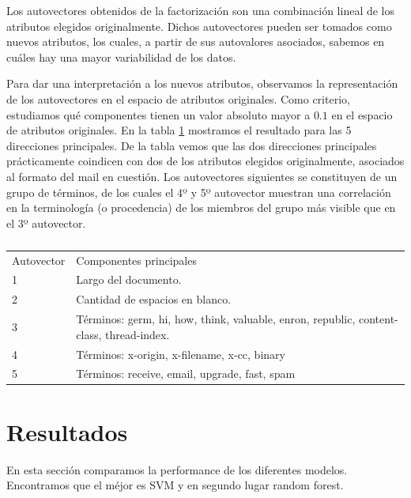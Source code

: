 \documentclass[a4paper,10pt]{article}
\begin{document}
\par Los autovectores obtenidos de la factorización son una combinación lineal de los atributos elegidos originalmente. Dichos autovectores pueden ser tomados como nuevos atributos, los cuales, a partir de sus autovalores asociados, sabemos en cuáles hay una mayor variabilidad de los datos. 
\par Para dar una interpretación a los nuevos atributos, observamos la representación de los autovectores en el espacio de atributos originales. Como criterio, estudiamos qué componentes tienen un valor absoluto mayor a $0.1$ en el espacio de atributos originales. En la tabla \ref{table:autovectores} mostramos el resultado para las 5 direcciones principales. De la tabla vemos que las dos direcciones principales prácticamente coindicen con dos de los atributos elegidos originalmente, asociados al formato del mail en cuestión. Los autovectores siguientes se constituyen de un grupo de términos, de los cuales el 4º y 5º autovector muestran una correlación en la terminología (o procedencia) de los miembros del grupo más visible que en el 3º autovector. 
\begin{table}
\centering
\caption{}
\label{table:autovectores}
\begin{tabular}{ll}
Autovector & Componentes principales \\
1 & Largo del documento. \\
2 & Cantidad de espacios en blanco. \\
3 & Términos: germ, hi, how, think, valuable, enron, republic, content-class, thread-index. \\
4 & Términos: x-origin, x-filename, x-cc, binary \\
5 & Términos: receive, email, upgrade, fast, spam \\
\end{tabular}
\end{table}


\section{Resultados}

En esta secci\'on comparamos la performance de los diferentes modelos. Encontramos que el m\'ejor es SVM y en segundo lugar random forest.   \\

\end{document}
